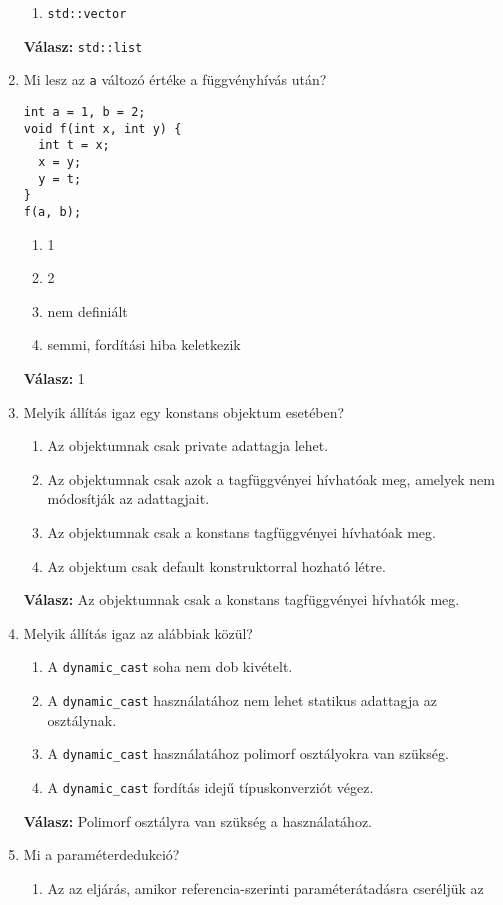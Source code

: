 \documentclass[../cpp_book/cpp_book.tex]{subfiles}
\begin{document}
\begin{enumerate}[1.)]
\begin{enumerate}
			\item \texttt{std::vector}
		\end{enumerate}
		\textbf{Válasz:} \texttt{std::list}
		\item Mi lesz az \texttt{a} változó értéke a függvényhívás után?
		\begin{lstlisting}
int a = 1, b = 2;
void f(int x, int y) {
  int t = x;
  x = y;
  y = t;
}
f(a, b);
		\end{lstlisting}
		\begin{enumerate}
			\item 1
			\item 2
			\item nem definiált
			\item semmi, fordítási hiba keletkezik
		\end{enumerate}
		\textbf{Válasz:} 1
		\item Melyik állítás igaz egy konstans objektum esetében?
		\begin{enumerate}
			\item Az objektumnak csak private adattagja lehet.
			\item Az objektumnak csak azok a tagfüggvényei hívhatóak meg, amelyek nem
			módosítják az adattagjait.
			\item Az objektumnak csak a konstans tagfüggvényei hívhatóak meg.
			\item Az objektum csak default konstruktorral hozható létre.
		\end{enumerate}
		\textbf{Válasz:} Az objektumnak csak a konstans tagfüggvényei hívhatók meg.
		\item Melyik állítás igaz az alábbiak közül?
		\begin{enumerate}
			\item A \texttt{dynamic\_cast} soha nem dob kivételt.
			\item A \texttt{dynamic\_cast} használatához nem lehet statikus adattagja az osztálynak.
			\item A \texttt{dynamic\_cast} használatához polimorf osztályokra van szükség.
			\item A \texttt{dynamic\_cast} fordítás idejű típuskonverziót végez.
		\end{enumerate}
		\textbf{Válasz:} Polimorf osztályra van szükség a használatához.
		\item Mi a paraméterdedukció?
		\begin{enumerate}
			\item Az az eljárás, amikor referencia-szerinti paraméterátadásra cseréljük az

\end{enumerate}
\end{enumerate}
\end{document}
